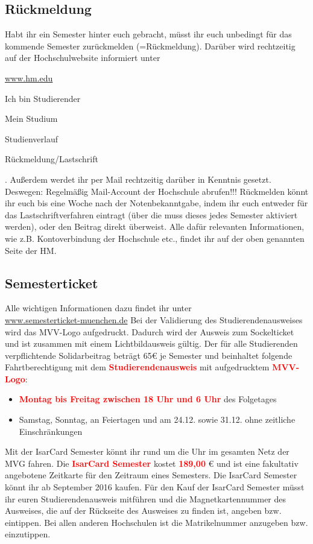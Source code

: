 \subsection{Rückmeldung}

Habt ihr ein Semester hinter euch gebracht, müsst ihr euch unbedingt für das kommende Semester zurückmelden (=Rückmeldung). Darüber wird rechtzeitig auf der Hochschulwebsite informiert unter
\begin{sitenav}
	\item \url{www.hm.edu}
	\item Ich bin Studierender
	\item Mein Studium
	\item Studienverlauf
	\item Rückmeldung/Lastschrift
\end{sitenav}. Außerdem werdet ihr per Mail rechtzeitig darüber in Kenntnis gesetzt. Deswegen: Regelmäßig Mail-Account der Hochschule abrufen!!! Rückmelden könnt ihr euch bis eine Woche nach der Notenbekanntgabe, indem ihr euch entweder für das Lastschriftverfahren eintragt (über die  muss dieses jedes Semester aktiviert werden), oder den Beitrag direkt überweist.\doublebreak
Alle dafür relevanten Informationen, wie z.B. Kontoverbindung der Hochschule etc., findet ihr auf der oben genannten Seite der HM.


\subsection{Semesterticket}

Alle wichtigen Informationen dazu findet ihr unter\\
\url{www.semesterticket-muenchen.de}\doublebreak
Bei der Validierung des Studierendenausweises wird das MVV-Logo aufgedruckt. Dadurch wird der Ausweis zum Sockelticket und ist zusammen mit einem Lichtbildausweis gültig. Der für alle Studierenden verpflichtende Solidarbeitrag beträgt 65€ je Semester und beinhaltet folgende Fahrtberechtigung mit dem \textcolor{red}{\textbf{Studierendenausweis}} mit aufgedrucktem \textcolor{red}{\textbf{MVV-Logo}}:
\begin{itemize}
	\item \textcolor{red}{\textbf{Montag bis Freitag zwischen 18 Uhr und 6 Uhr}} des Folgetages
	\item Samstag, Sonntag, an Feiertagen und am 24.12. sowie 31.12. ohne
	zeitliche Einschränkungen
\end{itemize}
Mit der IsarCard Semester könnt ihr rund um die Uhr im gesamten Netz der MVG fahren. Die \textcolor{red}{\textbf{IsarCard Semester}} kostet \textcolor{red}{\textbf{189,00}} € und ist eine fakultativ angebotene Zeitkarte für den Zeitraum eines Semesters. Die IsarCard Semester könnt ihr ab September 2016 kaufen. Für den Kauf der IsarCard Semester müsst ihr euren Studierendenausweis mitführen und die Magnetkartennummer des Ausweises, die auf der Rückseite des Ausweises zu finden ist, angeben bzw. eintippen. Bei allen anderen Hochschulen ist die Matrikelnummer anzugeben bzw. einzutippen.

